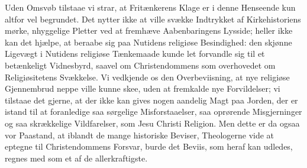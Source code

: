 \documentclass[12pt,a4paper]{book}
\begin{document}
Uden Omsvøb tilstaae vi strar, at Fritænkerens Klage er i denne Henseende kun altfor vel
begrundet. Det nytter ikke at ville svække Indtrykket af Kirkehistoriens mørke,
nhyggelige Pletter
ved at fremhæve Aabenbaringens Lysside; heller ikke kan det hjælpe, at beraabe sig paa
Nutidens religiøse Besindighed: den skjønne Ligevægt i Nutidens religiøse Tænkemaade
kunde let forvandle sig til et betænkeligt Vidnesbyrd, saavel om Christendommens som
overhovedet om Religiøsitetens Svækkelse. Vi vedkjende os den Overbeviisning, at nye
religiøse Gjennembrud neppe ville kunne skee, uden at fremkalde nye Forvildelser; vi
tilstaae det gjerne, at der ikke kan gives nogen aandelig Magt paa Jorden, der er istand
til at foranledige saa sørgelige Misforstaaelser, saa oprørende Misgjerninger og saa
skrækkelige Vildfarelser, som Jesu Christi Religion. Men dette er da ogsaa vor Paastand,
at iblandt de mange historiske Beviser, Theologerne vide at eptegne til Christendommens
Forsvar, burde det Beviis, som heraf kan udledes, regnes med som et af de
allerkraftigste.
\end{document}
